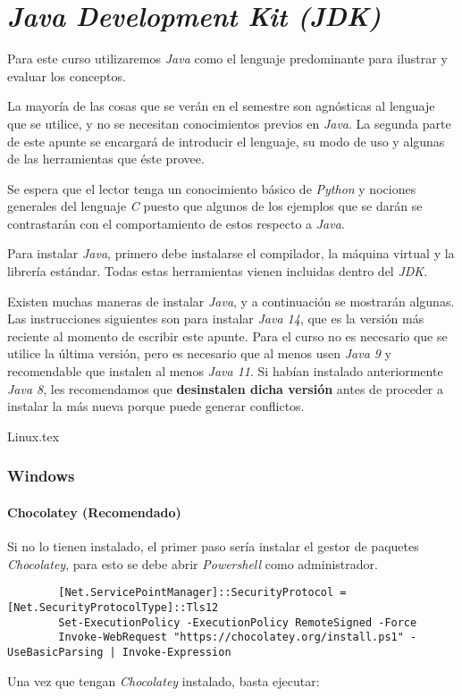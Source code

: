 \chapter{\textit{Java Development Kit (JDK)}}
  Para este curso utilizaremos \textit{Java} como el lenguaje predominante para ilustrar y
  evaluar los conceptos.

  La mayoría de las cosas que se verán en el semestre son agnósticas al lenguaje que se 
  utilice, y no se necesitan conocimientos previos en \textit{Java}.
  La segunda parte de este apunte se encargará de introducir el lenguaje, su modo de uso y
  algunas de las herramientas que éste provee.

  Se espera que el lector tenga un conocimiento básico de \textit{Python} y nociones 
  generales del lenguaje \textit{C} puesto que algunos de los ejemplos que se darán se 
  contrastarán con el comportamiento de estos respecto a \textit{Java}.

  Para instalar \textit{Java}, primero debe instalarse el compilador, la máquina virtual
  y la librería estándar.
  Todas estas herramientas vienen incluidas dentro del \textit{JDK}.

  Existen muchas maneras de instalar \textit{Java}, y a continuación se mostrarán 
  algunas.
  Las instrucciones siguientes son para instalar \textit{Java 14}, que es la versión más
  reciente al momento de escribir este apunte.
  Para el curso no es necesario que se utilice la última versión, pero es necesario que
  al menos usen \textit{Java 9} y recomendable que instalen al menos \textit{Java 11}.
  Si habían instalado anteriormente \textit{Java 8}, les recomendamos que 
  \textbf{desinstalen dicha versión} antes de proceder a instalar la más nueva porque 
  puede generar conflictos.

  {Linux.tex}
  \subsection{Windows}
    \subsubsection{Chocolatey (Recomendado)}
      Si no lo tienen instalado, el primer paso sería instalar el gestor de paquetes 
      \textit{Chocolatey}, para esto se debe abrir \textit{Powershell} como 
      administrador.

      \begin{verbatim}
        [Net.ServicePointManager]::SecurityProtocol = [Net.SecurityProtocolType]::Tls12
        Set-ExecutionPolicy -ExecutionPolicy RemoteSigned -Force
        Invoke-WebRequest "https://chocolatey.org/install.ps1" -UseBasicParsing | Invoke-Expression
      \end{verbatim}

      Una vez que tengan \textit{Chocolatey} instalado, basta ejecutar:
%